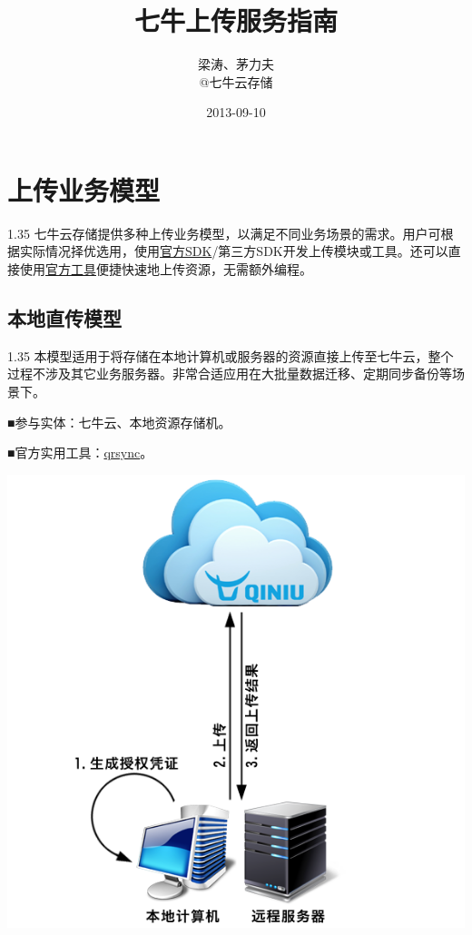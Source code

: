 \documentclass[11pt, oneside]{book}
\title{七牛上传服务指南}
\author{梁涛、茅力夫 \\ @七牛云存储}
\date{2013-09-10}
\newcommand{\qpara}[1]{
\vspace{0.2em}
\begin{spacing}{1.35}
\noindent
#1\par
\end{spacing}
\vspace{0.2em}
}
\newcommand{\qblock}[1]{
\vspace{0.1em}
\noindent
#1\par
\vspace{0.1em}
}
\begin{document}
\maketitle
\tableofcontents

\chapter{上传业务模型}

\qpara{七牛云存储提供多种上传业务模型，以满足不同业务场景的需求。用户可根据实际情况择优选用，使用\href{http://docs.qiniu.com/sdk/index.html}{官方SDK}/第三方SDK开发上传模块或工具。还可以直接使用\href{http://docs.qiniu.com/tools/v6/index.html}{官方工具}便捷快速地上传资源，无需额外编程。}

\section{本地直传模型}

\qpara{本模型适用于将存储在本地计算机或服务器的资源直接上传至七牛云，整个过程不涉及其它业务服务器。非常合适应用在大批量数据迁移、定期同步备份等场景下。}
\qblock{■\thinspace 参与实体：七牛云、本地资源存储机。}
\qblock{■\thinspace 官方实用工具：\href{http://docs.qiniu.com/tools/v6/qrsync.html}{qrsync}。}

\begin{center}
\includegraphics[scale=1]{../pics/upload/local_upload_direct.png}
\end{center}
\end{document}
